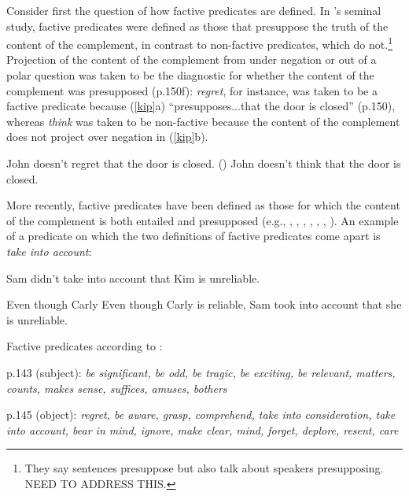 \documentclass[11pt,fleqn]{article}
\newcommand{\6}{\mbox{$[\hspace*{-.6mm}[$}}
\newcommand{\9}{\mbox{$]\hspace*{-.6mm}]$}}
\newcommand{\citepos}[1]{\citeauthor{#1}'s \citeyear{#1}}
\begin{document}
Consider first the question of how factive predicates are defined. In \citepos{kiparsky-kiparsky70} seminal study, factive predicates were defined as those that presuppose the truth of the content of the complement, in contrast to non-factive predicates, which do not.\footnote{They say sentences presuppose but also talk about speakers presupposing. NEED TO ADDRESS THIS.} Projection of the content of the complement from under negation or out of a polar question was taken to be the diagnostic for whether the content of the complement was presupposed (p.150f): {\em regret}, for instance, was taken to be a factive predicate because (\ref{kip}a) ``presupposes...that the door is closed'' (p.150),  whereas {\em think} was taken to be non-factive because the content of the complement does not project over negation in (\ref{kip}b). 

\begin{exe}
\ex\label{kip}
\begin{xlist}
\ex John doesn't regret that the door is closed. \hfill (\citealt[150]{kiparsky-kiparsky70})
\ex John doesn't think that the door is closed.
\end{xlist}
\end{exe}

More recently, factive predicates have been defined as those for which the content of the complement is both entailed and presupposed (e.g., \citealt[119-123]{gazdar79a}, \citealt[355]{ccmg90}, \citealt[345]{vds92},  \citealt[3]{abbott06}, \citealt[139]{schlenker10}, \citealt[77]{anand-hacquard2014}, \citealt[fn.7]{spector-egre2015}). An example of a predicate on which the two definitions of factive predicates come apart is {\em take into account}:

\begin{exe}
\ex
\begin{xlist}
\ex Sam didn't take into account that Kim is unreliable.

\ex Even though Carly Even though Carly is reliable, Sam took into account that she is unreliable. 

\end{xlist}
\end{exe}

Factive predicates according to \citet{kiparsky-kiparsky70}: 

p.143 (subject): {\em be significant, be odd, be tragic, be exciting, be relevant, matters, counts, makes sense, suffices, amuses, bothers}

p.145 (object): {\em regret, be aware, grasp, comprehend, take into consideration, take into account, bear in mind, ignore, make clear, mind, forget, deplore, resent, care}
\end{document}
